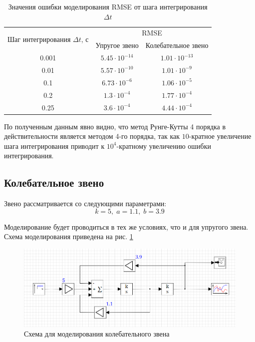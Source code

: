 		
	\begin{table}[h]
		\begin{center}
			\begin{tabular}{|c|cc|}
				\hline
				\multirow{2}{*}{Шаг интегрирования $\Delta t$, с} & \multicolumn{2}{c|}{RMSE}                                         \\ \cline{2-3} 
				& \multicolumn{1}{c|}{Упругое звено}        & Колебательное звено  \\ \hline
				0.001                                             & \multicolumn{1}{c|}{$5.45\cdot 10^{-14}$} & $1.01\cdot 10^{-13}$ \\ \hline
				0.01                                              & \multicolumn{1}{c|}{$5.57\cdot 10^{-10}$} & $1.01\cdot 10^{-9}$  \\ \hline
				0.1                                               & \multicolumn{1}{c|}{$6.73\cdot 10^{-6}$}  & $1.06\cdot 10^{-5}$  \\ \hline
				0.2                                               & \multicolumn{1}{c|}{$1.3\cdot 10^{-4}$}   & $1.77\cdot 10^{-4}$  \\ \hline
				0.25                                              & \multicolumn{1}{c|}{$3.6\cdot 10^{-4}$}   & $4.44\cdot 10^{-4}$  \\ \hline
			\end{tabular}
			\caption{Значения ошибки моделирования RMSE от шага интегрирования $\Delta t$}
			\label{table1}
		\end{center}
	\end{table}		
	
	По полученным данным явно видно, что метод Рунге-Кутты 4 порядка в действительности является методом 4-го порядка, так как $10$-кратное увеличение шага интегрирования приводит к $10^4$-кратному увеличению ошибки интегрирования.
	
	\subsection{Колебательное звено}
	
	Звено рассматривается со следующими параметрами:
	\begin{equation*}
		k=5,\;a=1.1,\;b=3.9
	\end{equation*}

	Моделирование будет проводиться в тех же условиях, что и для упругого звена. Схема моделирования приведена на рис. \ref{scheme2}
	
	\begin{figure}[h]
		\centering\includegraphics[width=.7\textwidth]{png/scheme2.png}
		\caption{Схема для моделирования колебательного звена}
		\label{scheme2}
	\end{figure}

